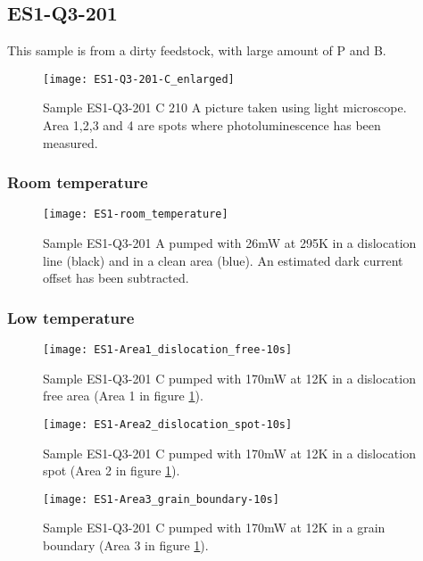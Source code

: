 \subsection{ES1-Q3-201}

This sample is from a dirty feedstock, with large amount of P and B.


\begin{figure}[H]
\centering
\texttt{[image: ES1-Q3-201-C\_enlarged]}
\caption[ES1-Q3-201 C from light microscope]{Sample ES1-Q3-201 C 210 A picture taken using light microscope. Area 1,2,3 and 4 are spots where photoluminescence has been measured.}
\label{fig:ES1-Q3-201-C_enlarged}%
\end{figure}

\subsubsection{Room temperature}

\begin{figure}[H]
\centering
\texttt{[image: ES1-room\_temperature]}
\caption[ES1-Q3-201 at room temperature]{Sample ES1-Q3-201 A pumped with 26mW at 295K in a dislocation line (black) and in a clean area (blue). An estimated dark current offset has been subtracted.}
\label{fig:ES1-room_temperature}%
\end{figure}


\subsubsection{Low temperature}

\begin{figure}[H]
\centering
\texttt{[image: ES1-Area1\_dislocation\_free-10s]}
\caption[ES1-Q3-201 at a dislocation free area]{Sample ES1-Q3-201 C pumped with 170mW at 12K in a dislocation free area (Area 1 in figure \ref{fig:ES1-Q3-201-C_enlarged}).}
\label{fig:ES1-Area1_dislocation_free-10s}%
\end{figure}

\begin{figure}[H]
\centering
\texttt{[image: ES1-Area2\_dislocation\_spot-10s]}
\caption[ES1-Q3-201 at a dislocation free area]{Sample ES1-Q3-201 C pumped with 170mW at 12K in a dislocation spot (Area 2 in figure \ref{fig:ES1-Q3-201-C_enlarged}).}
\label{fig:ES1-Area2_dislocation_spot-10s}%
\end{figure}


\begin{figure}[H]
\centering
\texttt{[image: ES1-Area3\_grain\_boundary-10s]}
\caption[ES1-Q3-201 at a grain boundary]{Sample ES1-Q3-201 C pumped with 170mW at 12K in a grain boundary (Area 3 in figure \ref{fig:ES1-Q3-201-C_enlarged}).}
\label{fig:ES1-Area3_grain_boundary-10s}%
\end{figure}

